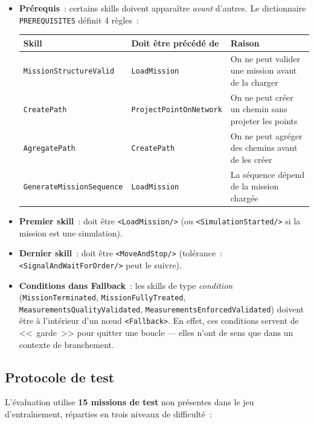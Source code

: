 \documentclass[a4paper,11pt]{article}
\newcommand{\skill}[1]{\texttt{<#1/>}}
\begin{document}
\begin{itemize}
    \item \textbf{Prérequis}~: certains skills doivent apparaître
    \emph{avant} d'autres. Le dictionnaire \texttt{PREREQUISITES} définit
    4 règles~:

    \begin{table}[h]
    \centering
    \begin{tabular}{@{}l l l@{}}
    \toprule
    \textbf{Skill} & \textbf{Doit être précédé de} & \textbf{Raison} \\
    \midrule
    \texttt{MissionStructureValid} & \texttt{LoadMission} & On ne peut
    valider une mission avant de la charger \\
    \texttt{CreatePath} & \texttt{ProjectPointOnNetwork} & On ne peut créer
    un chemin sans projeter les points \\
    \texttt{AgregatePath} & \texttt{CreatePath} & On ne peut agréger des
    chemins avant de les créer \\
    \texttt{GenerateMissionSequence} & \texttt{LoadMission} & La séquence
    dépend de la mission chargée \\
    \bottomrule
    \end{tabular}
    \end{table}

    \item \textbf{Premier skill}~: doit être \skill{LoadMission} (ou
    \skill{SimulationStarted} si la mission est une simulation).
    \item \textbf{Dernier skill}~: doit être \skill{MoveAndStop} (tolérance~:
    \skill{SignalAndWaitForOrder} peut le suivre).
    \item \textbf{Conditions dans Fallback}~: les skills de type
    \emph{condition} (\texttt{MissionTerminated},
    \texttt{MissionFullyTreated}, \texttt{MeasurementsQualityValidated},
    \texttt{MeasurementsEnforcedValidated}) doivent être à l'intérieur d'un
    nœud \texttt{<Fallback>}. En effet, ces conditions servent de
    <<~garde~>> pour quitter une boucle --- elles n'ont de sens que dans un
    contexte de branchement.
\end{itemize}

\subsection{Protocole de test}

L'évaluation utilise \textbf{15 missions de test} non présentes dans le
jeu d'entraînement, réparties en trois niveaux de difficulté~:
\end{document}
